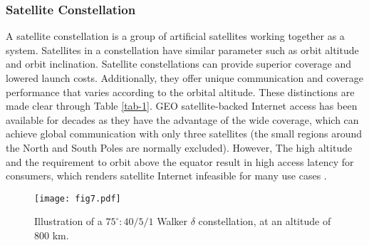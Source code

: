 \documentclass[lettersize,journal]{IEEEtran}
\begin{document}
\subsubsection*{Satellite Constellation}

A satellite constellation is a group of artificial satellites working together as a system. Satellites in a constellation have similar parameter such as orbit altitude and orbit inclination. Satellite constellations can provide superior coverage and lowered launch costs. Additionally, they offer unique communication and coverage performance that varies according to the orbital altitude. These distinctions are made clear through Table \ref{tab-1}. GEO satellite-backed Internet access has been available for decades as they have the advantage of the wide coverage, which can achieve global communication with only three satellites (the small regions around the North and South Poles are normally excluded). However, The high altitude and the requirement to orbit above the equator result in high access latency for consumers, which renders satellite Internet infeasible  for many use cases \cite{RN168, RN169}.   

\begin{figure}
  \centering
  \texttt{[image: fig7.pdf]}
  \caption{Illustration of a $75^\circ:40/5/1$ Walker $\delta$ constellation, at an altitude of 800 km.}
  \label{fig:7}
\end{figure}
\end{document}
